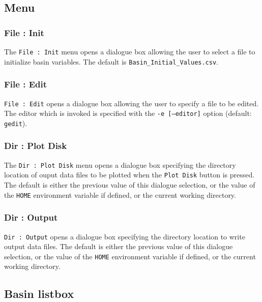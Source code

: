 \clearpage 

\subsection{Menu}
\label{sec:Menu}
\subsubsection{File : Init}
The \texttt{File : Init} menu opens a dialogue box allowing the user to select a file to initialize basin variables.  The default is \texttt{Basin\_Initial\_Values.csv}.

\subsubsection{File : Edit}
\texttt{File : Edit} opens a dialogue box allowing the user to specify a file to be edited.  The editor which is invoked is specified with the \texttt{-e [--editor]} option (default: \texttt{gedit}). 

\subsubsection{Dir : Plot Disk}
The \texttt{Dir : Plot Disk} menu opens a dialogue box specifying the directory location of ouput data files to be plotted when the \texttt{Plot Disk} button is pressed.  The default is either the previous value of this dialogue selection, or the value of the \texttt{HOME} environment variable if defined, or the current working directory.

\subsubsection{Dir : Output}
\texttt{Dir : Output} opens a dialogue box specifying the directory location to write output data files.  The default is either the previous value of this dialogue selection, or the value of the \texttt{HOME} environment variable if defined, or the current working directory.

\clearpage
\subsection{Basin listbox}
\label{sec:Basin listbox}

